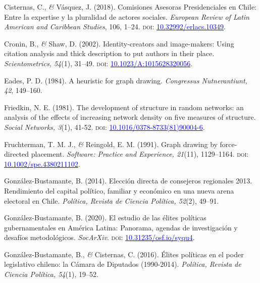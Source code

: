 \documentclass[a4paper]{tufte-handout}
\begin{document}
{\begin{list}{}
\item{\small Cisternas, C., {\itshape \&} Vásquez, J. (2018). Comisiones Asesoras Presidenciales en Chile: Entre la expertise y la pluralidad de actores sociales. {\itshape European Review of Latin American and Caribbean Studies}, 106, 1--24. {\scshape doi}: \href{http://doi.org/10.32992/erlacs.10349}{\textcolor{blue}{10.32992/erlacs.10349}}.}

\item{\small Cronin, B., {\itshape \&} Shaw, D. (2002). Identity-creators and image-makers: Using citation analysis and thick description to put authors in their place. {\itshape Scientometrics, 54}(1), 31--49. {\scshape doi}: \href{https://doi.org/10.1023/A:1015628320056}{\textcolor{blue}{10.1023/A:1015628320056}}.}

\item{\small Eades, P. D. (1984). A heuristic for graph drawing. {\itshape Congressus Nutnerantiunt, 42}, 149--160.}

\item{\small Friedkin, N. E. (1981). The development of structure in random networks: an analysis of the effects of increasing network density on five measures of structure. {\itshape Social Networks, 3}(1), 41-52. {\scshape doi:} \href{https://doi.org/10.1016/0378-8733(81)90004-6}{\textcolor{blue}{10.1016/0378-8733(81)90004-6}}.}

\item{\small Fruchterman, T. M. J., {\itshape \&} Reingold, E. M. (1991). Graph drawing by force-directed placement. {\itshape Software: Practice and Experience, 21}(11), 1129--1164. {\scshape doi:} \href{https://doi.org/10.1002/spe.4380211102}{\textcolor{blue}{10.1002/spe.4380211102}}.}

\item{\small González-Bustamante, B. (2014). Elección directa de consejeros regionales 2013. Rendimiento del capital político, familiar y económico en una nueva arena electoral en Chile. {\itshape Política, Revista de Ciencia Política, 52}(2), 49--91.}

\item{\small González-Bustamante, B. (2020). El estudio de las élites políticas gubernamentales en América Latina: Panorama, agendas de investigación y desafíos metodológicos. {\itshape SocArXiv}. {\scshape doi:} \href{https://doi.org/10.31235/osf.io/syqu4}{\textcolor{blue}{10.31235/osf.io/syqu4}}.}

\item{\small González-Bustamante, B., {\itshape \&} Cisternas, C. (2016). Élites políticas en el poder legislativo chileno: la Cámara de Diputados (1990-2014). {\itshape Política, Revista de Ciencia Política, 54}(1), 19--52.}


\end{list}}
\end{document}
